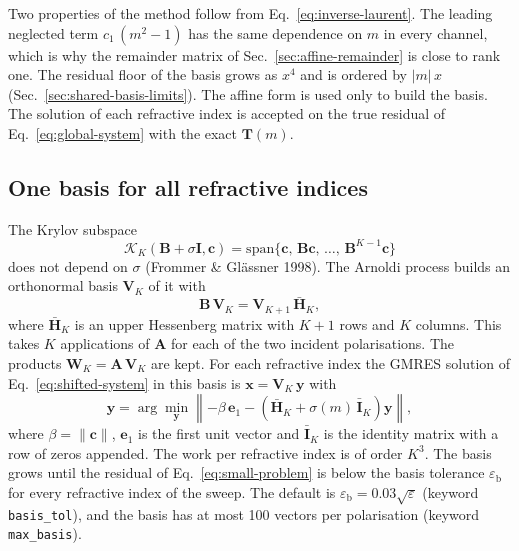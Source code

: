 \documentclass[11pt,a4paper]{article}
\begin{document}
Two properties of the method follow from Eq.~\eqref{eq:inverse-laurent}.
The leading neglected term $c_1\,(m^2 - 1)$ has the same dependence on $m$ in every channel, which is why the remainder matrix of Sec.~\ref{sec:affine-remainder} is close to rank one.
The residual floor of the basis grows as $x^4$ and is ordered by $|m|\,x$ (Sec.~\ref{sec:shared-basis-limits}).
The affine form is used only to build the basis.
The solution of each refractive index is accepted on the true residual of Eq.~\eqref{eq:global-system} with the exact $\mathbf{T}(m)$.

\subsection{One basis for all refractive indices}
The Krylov subspace
\begin{equation}
  \mathcal{K}_K(\mathbf{B} + \sigma\mathbf{I}, \bm{c}) = \mathrm{span}\{\bm{c},\, \mathbf{B}\bm{c},\, \dots,\, \mathbf{B}^{K-1}\bm{c}\}
  \label{eq:shift-invariance}
\end{equation}
does not depend on $\sigma$ (Frommer \& Gl\"assner 1998).
The Arnoldi process builds an orthonormal basis $\mathbf{V}_K$ of it with
\begin{equation}
  \mathbf{B}\,\mathbf{V}_K = \mathbf{V}_{K+1}\,\bar{\mathbf{H}}_K,
  \label{eq:arnoldi}
\end{equation}
where $\bar{\mathbf{H}}_K$ is an upper Hessenberg matrix with $K+1$ rows and $K$ columns.
This takes $K$ applications of $\mathbf{A}$ for each of the two incident polarisations.
The products $\mathbf{W}_K = \mathbf{A}\,\mathbf{V}_K$ are kept.
For each refractive index the GMRES solution of Eq.~\eqref{eq:shifted-system} in this basis is $\bm{x} = \mathbf{V}_K\,\bm{y}$ with
\begin{equation}
  \bm{y} = \arg\min_{\bm{y}} \left\| -\beta\,\bm{e}_1 - \left(\bar{\mathbf{H}}_K + \sigma(m)\,\bar{\mathbf{I}}_K\right)\bm{y} \right\|,
  \label{eq:small-problem}
\end{equation}
where $\beta = \|\bm{c}\|$, $\bm{e}_1$ is the first unit vector and $\bar{\mathbf{I}}_K$ is the identity matrix with a row of zeros appended.
The work per refractive index is of order $K^3$.
The basis grows until the residual of Eq.~\eqref{eq:small-problem} is below the basis tolerance $\varepsilon_\mathrm{b}$ for every refractive index of the sweep.
The default is $\varepsilon_\mathrm{b} = 0.03\sqrt{\varepsilon}$ (keyword \texttt{basis\_tol}), and the basis has at most 100 vectors per polarisation (keyword \texttt{max\_basis}).
\end{document}
